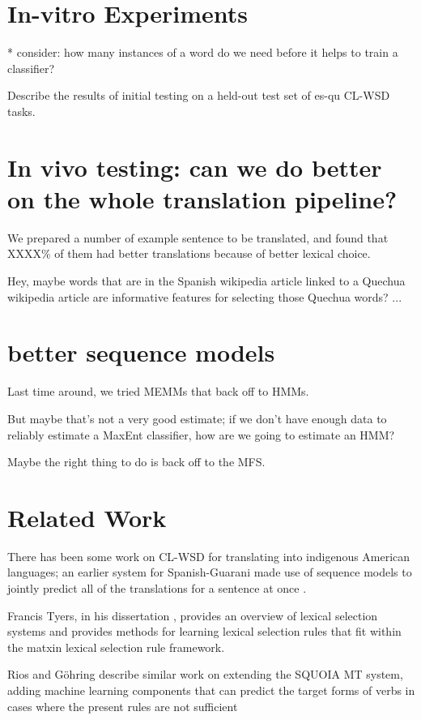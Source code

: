 \documentclass[10pt, a4paper]{article}
\begin{document}
\section{In-vitro Experiments}
* consider: how many instances of a word do we need before it helps to train a
classifier?


Describe the results of initial testing on a held-out test set of es-qu CL-WSD
tasks.


\section{In vivo testing: can we do better on the whole translation pipeline?}


We prepared a number of example sentence to be translated, and found that
XXXX\% of them had better translations because of better lexical choice.


Hey, maybe words that are in the Spanish wikipedia article linked to a Quechua
wikipedia article are informative features for selecting those Quechua words?
...


\section{better sequence models}
Last time around, we tried MEMMs that back off to HMMs.


But maybe that's not a very good estimate; if we don't have enough data to
reliably estimate a MaxEnt classifier, how are we going to estimate an HMM?


Maybe the right thing to do is back off to the MFS.


\section{Related Work}

There has been some work on CL-WSD for translating into indigenous American
languages; an earlier system for Spanish-Guarani made use of sequence models to
jointly predict all of the translations for a sentence at once
\cite{rudnick-gasser:2013:HyTra}.

Francis Tyers, in his dissertation \cite{tyers-dissertation}, provides an
overview of lexical selection systems and provides methods for learning lexical
selection rules that fit within the %
matxin lexical selection rule framework.

Rios and G\"{o}hring  describe
similar work on extending the SQUOIA MT system, adding machine learning
components that can predict the target forms of verbs in cases where the
present rules are not sufficient 
\end{document}
